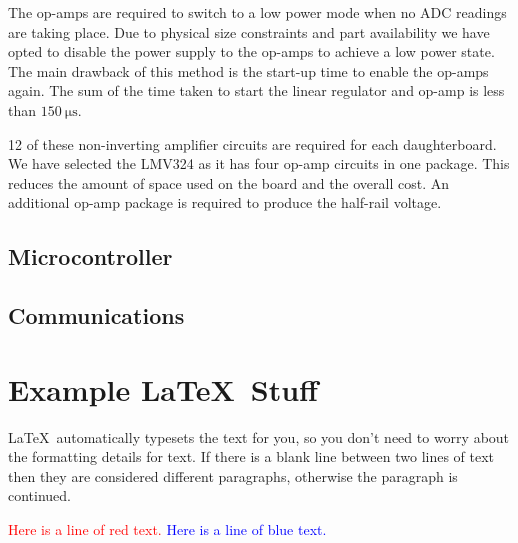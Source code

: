 \documentclass[12pt]{article}
\begin{document}
The op-amps are required to switch to a low power mode when no ADC readings are taking place.
Due to physical size constraints and part availability we have opted to disable the power supply to the op-amps to achieve a low power state.
The main drawback of this method is the start-up time to enable the op-amps again.
The sum of the time taken to start the linear regulator and op-amp is less than $\SI{150}{\micro\second}$.

12 of these non-inverting amplifier circuits are required for each daughterboard.
We have selected the LMV324 as it has four op-amp circuits in one package.
This reduces the amount of space used on the board and the overall cost.
An additional op-amp package is required to produce the half-rail voltage.

\subsection{Microcontroller}




\subsection{Communications}
















\newpage

\section{Example \LaTeX\ Stuff}

\LaTeX\ automatically typesets the text for you, so you don't need to worry about the formatting details for text.
If there is a blank line between two lines of text then they are considered different paragraphs, otherwise the paragraph is continued.

\textcolor{red}{Here is a line of red text.}
\textcolor{blue}{Here is a line of blue text.}
\end{document}
